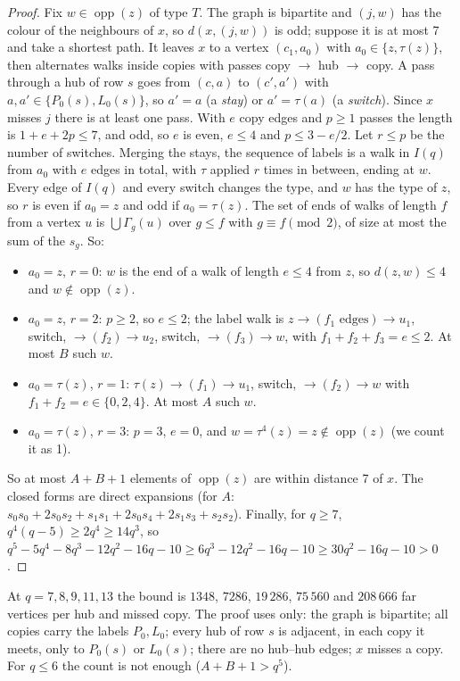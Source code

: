\documentclass[11pt]{amsart}
\theoremstyle{definition}
\theoremstyle{remark}
\numberwithin{equation}{section}
\newcommand{\opp}{\operatorname{opp}}
\begin{document}
\begin{proof}
Fix $w\in\opp(z)$ of type $T$. The graph is bipartite and $(j,w)$ has the colour of the neighbours of $x$, so $d(x,(j,w))$ is
odd; suppose it is at most 7 and take a shortest path. It leaves $x$ to a vertex $(c_1,a_0)$ with $a_0\in\{z,\tau(z)\}$, then
alternates walks inside copies with passes copy $\to$ hub $\to$ copy. A pass through a hub of row $s$ goes from $(c,a)$ to
$(c',a')$ with $a,a'\in\{P_0(s),L_0(s)\}$, so $a'=a$ (a \emph{stay}) or $a'=\tau(a)$ (a \emph{switch}). Since $x$ misses $j$ there
is at least one pass. With $e$ copy edges and $p\ge1$ passes the length is $1+e+2p\le7$, and odd, so $e$ is even, $e\le4$ and
$p\le3-e/2$. Let $r\le p$ be the number of switches. Merging the stays, the sequence of labels is a walk in $I(q)$ from $a_0$
with $e$ edges in total, with $\tau$ applied $r$ times in between, ending at $w$. Every edge of $I(q)$ and every switch
changes the type, and $w$ has the type of $z$, so $r$ is even if $a_0=z$ and odd if $a_0=\tau(z)$. The set of ends of walks of
length $f$ from a vertex $u$ is $\bigcup\Gamma_g(u)$ over $g\le f$ with $g\equiv f\pmod 2$, of size at most the sum of the
$s_g$. So:
\begin{itemize}
\item $a_0=z$, $r=0$: $w$ is the end of a walk of length $e\le4$ from $z$, so $d(z,w)\le4$ and $w\notin\opp(z)$.
\item $a_0=z$, $r=2$: $p\ge2$, so $e\le2$; the label walk is $z\to(f_1\text{ edges})\to u_1$, switch, $\to(f_2)\to u_2$,
  switch, $\to(f_3)\to w$, with $f_1+f_2+f_3=e\le2$. At most $B$ such $w$.
\item $a_0=\tau(z)$, $r=1$: $\tau(z)\to(f_1)\to u_1$, switch, $\to(f_2)\to w$ with $f_1+f_2=e\in\{0,2,4\}$. At most $A$ such
  $w$.
\item $a_0=\tau(z)$, $r=3$: $p=3$, $e=0$, and $w=\tau^4(z)=z\notin\opp(z)$ (we count it as 1).
\end{itemize}
So at most $A+B+1$ elements of $\opp(z)$ are within distance 7 of $x$. The closed forms are direct expansions (for $A$:
$s_0s_0+2s_0s_2+s_1s_1+2s_0s_4+2s_1s_3+s_2s_2$). Finally, for $q\ge7$, $q^4(q-5)\ge2q^4\ge14q^3$, so
$q^5-5q^4-8q^3-12q^2-16q-10\ge6q^3-12q^2-16q-10\ge30q^2-16q-10>0$.
\end{proof}

At $q=7,8,9,11,13$ the bound is $1348$, $7286$, $19\,286$, $75\,560$ and $208\,666$ far vertices per hub and missed copy. The
proof uses only: the graph is bipartite; all copies carry the labels $P_0,L_0$; every hub of row $s$ is adjacent, in each copy
it meets, only to $P_0(s)$ or $L_0(s)$; there are no hub--hub edges; $x$ misses a copy. For $q\le6$ the count is not enough
($A+B+1>q^5$).
\end{document}
